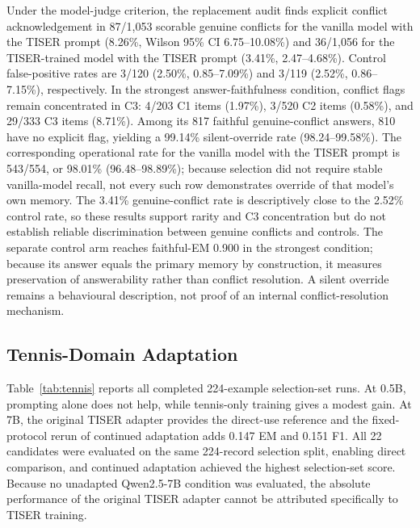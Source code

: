 \documentclass[conference]{IEEEtran}
\begin{document}
Under the model-judge criterion, the replacement audit finds explicit conflict acknowledgement in 87/1,053 scorable genuine conflicts for the vanilla model with the TISER prompt (8.26\%, Wilson 95\% CI 6.75--10.08\%) and 36/1,056 for the TISER-trained model with the TISER prompt (3.41\%, 2.47--4.68\%). Control false-positive rates are 3/120 (2.50\%, 0.85--7.09\%) and 3/119 (2.52\%, 0.86--7.15\%), respectively. In the strongest answer-faithfulness condition, conflict flags remain concentrated in C3: 4/203 C1 items (1.97\%), 3/520 C2 items (0.58\%), and 29/333 C3 items (8.71\%). Among its 817 faithful genuine-conflict answers, 810 have no explicit flag, yielding a 99.14\% silent-override rate (98.24--99.58\%). The corresponding operational rate for the vanilla model with the TISER prompt is 543/554, or 98.01\% (96.48--98.89\%); because selection did not require stable vanilla-model recall, not every such row demonstrates override of that model's own memory. The 3.41\% genuine-conflict rate is descriptively close to the 2.52\% control rate, so these results support rarity and C3 concentration but do not establish reliable discrimination between genuine conflicts and controls. The separate control arm reaches faithful-EM 0.900 in the strongest condition; because its answer equals the primary memory by construction, it measures preservation of answerability rather than conflict resolution. A silent override remains a behavioural description, not proof of an internal conflict-resolution mechanism.

\subsection{Tennis-Domain Adaptation}

Table~\ref{tab:tennis} reports all completed 224-example selection-set runs. At 0.5B, prompting alone does not help, while tennis-only training gives a modest gain. At 7B, the original TISER adapter provides the direct-use reference and the fixed-protocol rerun of continued adaptation adds 0.147 EM and 0.151 F1. All 22 candidates were evaluated on the same 224-record selection split, enabling direct comparison, and continued adaptation achieved the highest selection-set score. Because no unadapted Qwen2.5-7B condition was evaluated, the absolute performance of the original TISER adapter cannot be attributed specifically to TISER training.
\end{document}
